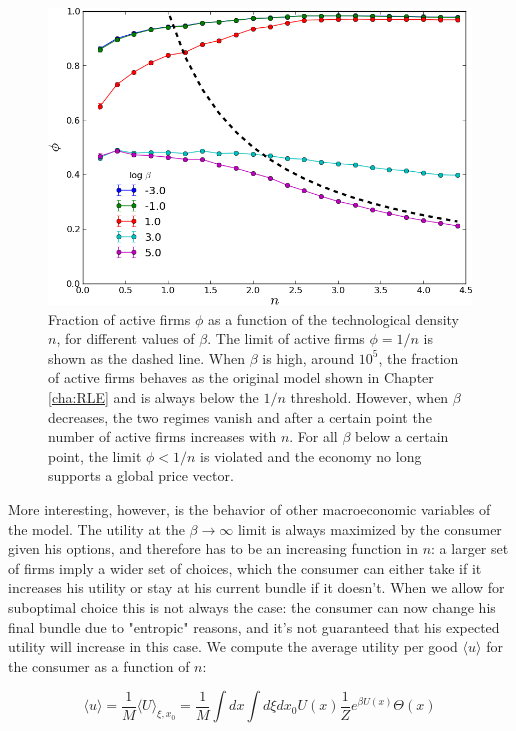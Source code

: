 \begin{figure}[!ht]
  \centering
  \includegraphics[width=.9\textwidth]{figs_inef/sPosMultipleBeta.png}
  \caption{Fraction of active firms $\phi$ as a function of the
    technological density $n$, for different values of $\beta$. The limit of active firms $\phi = 1/n$ is shown as the dashed line. When $\beta$ is high, around $10^5$, the fraction of active firms behaves as the original model shown in Chapter \ref{cha:RLE} and is always below the $1/n$ threshold. However, when $\beta$ decreases, the two regimes vanish and after a certain point the number of active firms increases with $n$. For all $\beta$ below a certain point, the limit $\phi < 1/n$ is violated and the economy no long supports a global price vector.}
  \label{fig:s_pos_n}
\end{figure}

More interesting, however, is the behavior of other macroeconomic
variables of the model. The utility at the $\beta \to \infty$ limit is always maximized by the consumer given his options, and therefore has to be an increasing function in $n$: a larger set of firms imply a wider set of choices, which the consumer can either take if it increases his utility or stay at his current bundle if it doesn't. When we allow for
suboptimal choice this is not always the case: the consumer can now change his final bundle due to "entropic" reasons, and it's not guaranteed that his expected utility will increase in this case. We compute the average utility per good
$\langle u \rangle$ for the consumer as a
function of $n$:

\begin{equation}
  \label{eq:inef_4}
  \langle u \rangle = \frac{1}{M} \langle U \rangle_{\xi, x_0} =
  \frac{1}{M} \int dx \int d\xi dx_0 U(x)
  \frac{1}{Z} e^{\beta U(x)} \Theta(x)
\end{equation}

